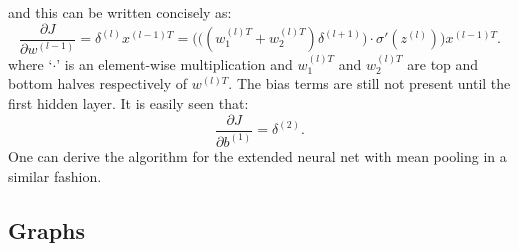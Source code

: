 \documentclass{article} %
\begin{document}
and this can be written concisely as:
\begin{equation}
\frac{\partial J}{\partial w^{(l-1)} } = \delta^{(l)}x^{(l-1)T}=\bigg (\bigg ( (w_1^{(l)T}+w_2^{(l)T})\delta ^{(l+1)}\bigg ) \cdot \sigma'(z^{(l)})\bigg )x^{(l-1)T}.
\end{equation}
where `$\cdot$' is an element-wise multiplication and $w_1^{(l)T}$ and $w_2^{(l)T}$ are top and bottom halves respectively of $w^{(l)T}$.
The bias terms are still not present until the first hidden layer. It is easily seen that:  
\begin{equation}
\frac{\partial J}{\partial b^{(1)} } = \delta^{(2)}.
\end{equation}
One can derive the algorithm for the extended neural net with mean pooling in a similar fashion.

\subsection{Graphs}
\end{document}
